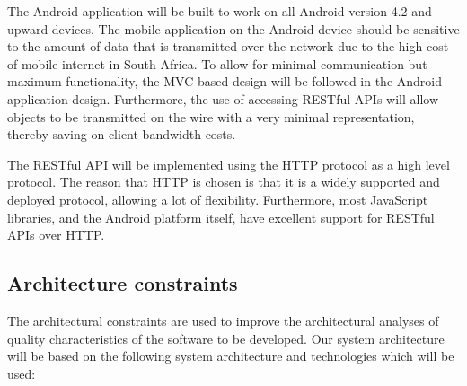 \documentclass[a4paper,10pt]{article}
\begin{document}
The Android application will be built to work on all Android version 4.2 and upward devices. The mobile application on the Android device should be sensitive to the amount of data that is transmitted over the network due to the high cost of mobile internet in South Africa. To allow for minimal communication but maximum functionality, the MVC based design will be followed in the Android application design.  Furthermore, the use of accessing RESTful APIs will allow objects to be transmitted on the wire with a very minimal representation, thereby saving on client bandwidth costs.

The RESTful API will be implemented using the HTTP protocol as a high level protocol. The reason that HTTP is chosen is that it is a widely supported and deployed protocol, allowing a lot of flexibility. Furthermore, most JavaScript libraries, and the Android platform itself, have excellent support for RESTful APIs over HTTP.

\subsection{Architecture constraints}
The architectural constraints are used to improve the architectural analyses of quality characteristics of the software to be developed. Our system architecture will be based on the following system architecture and technologies which will be used:
\end{document}
